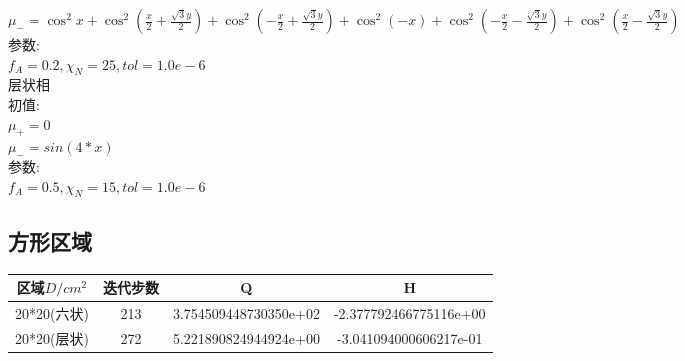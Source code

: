 \documentclass[12pt]{article}
\begin{document}
\begin{CJK}{UTF8}{gkai}
    $ \mu_-=\cos^{2}x+\cos^2 (\frac{x}{2}+\frac{\sqrt{3}y}{2})+\cos^2(-\frac{x}{2}+\frac{\sqrt{3}y}{2})+\cos^{2}(-x)+\cos^2 (-\frac{x}{2}-\frac{\sqrt{3}y}{2})+\cos^2 (\frac{x}{2}-\frac{\sqrt{3}y}{2})$\\
   
    参数:\\
    
     $f_A=0.2,\chi_N=25,tol=1.0e-6$\\
     
     层状相\\
     
     初值:\\
    
    $ \mu_+=0 $\\
    
    $ \mu_-=sin(4*x)$\\

    参数:\\
    
     $f_A=0.5,\chi_N=15,tol=1.0e-6$\\
     \subsection{方形区域}
   
     \begin{table}[H]
     	\centering
     	    \begin{tabular}{cccc}
     	    	
     	    	\toprule
     	    	区域$D/cm^2$&迭代步数 & Q &  H \\
     	    	\midrule    20*20(六状)&213&3.754509448730350e+02&-2.377792466775116e+00\\
     	    	20*20(层状)&272& 5.221890824944924e+00 &-3.041094000606217e-01\\
     	    	\bottomrule
     	    \end{tabular}
     \end{table} 


\end{CJK}
\end{document}
